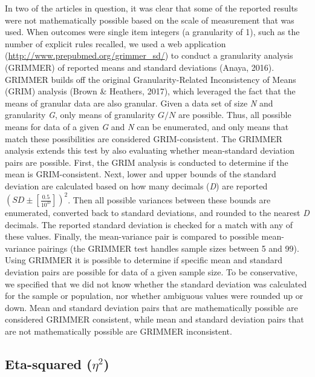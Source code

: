 \documentclass[
  english,
  man, donotrepeattitle,floatsintext]{apa7}
\begin{document}
In two of the articles in question, it was clear that some of the reported results were not mathematically possible based on the scale of measurement that was used. When outcomes were single item integers (a granularity of 1), such as the number of explicit rules recalled, we used a web application (\url{http://www.prepubmed.org/grimmer_sd/}) to conduct a granularity analysis (GRIMMER) of reported means and standard deviations (Anaya, 2016). GRIMMER builds off the original Granularity-Related Inconsistency of Means (GRIM) analysis (Brown \& Heathers, 2017), which leveraged the fact that the means of granular data are also granular. Given a data set of size \emph{N} and granularity \emph{G}, only means of granularity \(G/N\) are possible. Thus, all possible means for data of a given \emph{G} and \emph{N} can be enumerated, and only means that match these possibilities are considered GRIM-consistent. The GRIMMER analysis extends this test by also evaluating whether mean-standard deviation pairs are possible. First, the GRIM analysis is conducted to determine if the mean is GRIM-consistent. Next, lower and upper bounds of the standard deviation are calculated based on how many decimals (\emph{D}) are reported \((SD\pm[\frac{0.5}{10^{D}}])^{2}\). Then all possible variances between these bounds are enumerated, converted back to standard deviations, and rounded to the nearest \emph{D} decimals. The reported standard deviation is checked for a match with any of these values. Finally, the mean-variance pair is compared to possible mean-variance pairings (the GRIMMER test handles sample sizes between 5 and 99). Using GRIMMER it is possible to determine if specific mean and standard deviation pairs are possible for data of a given sample size. To be conservative, we specified that we did not know whether the standard deviation was calculated for the sample or population, nor whether ambiguous values were rounded up or down. Mean and standard deviation pairs that are mathematically possible are considered GRIMMER consistent, while mean and standard deviation pairs that are not mathematically possible are GRIMMER inconsistent.

\hypertarget{eta-squared-eta2}{%
\subsection{\texorpdfstring{Eta-squared (\(\eta^{2}\))}{Eta-squared (\textbackslash eta\^{}\{2\})}}\label{eta-squared-eta2}}
\end{document}
